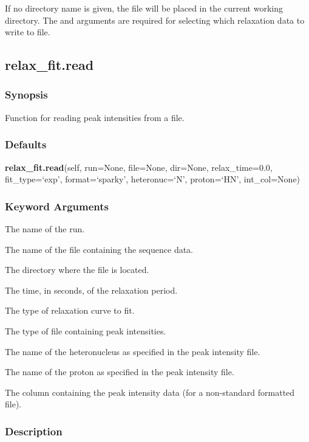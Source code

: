 If no directory name is given, the file will be placed in the current working directory.
The 
 and 
 arguments are required for selecting which relaxation data
to write to file.


\newpage

\subsection{relax\_fit.read}


\subsubsection{Synopsis}

Function for reading peak intensities from a file.

\subsubsection{Defaults}

\textsf{\textbf{relax\_fit.read}(self, run=None, file=None, dir=None, relax\_time=0.0, fit\_type=`exp', format=`sparky', heteronuc=`N', proton=`HN', int\_col=None)}


\subsubsection{Keyword Arguments}


  The name of the run.

  The name of the file containing the sequence data.

  The directory where the file is located.

  The time, in seconds, of the relaxation period.

  The type of relaxation curve to fit.

  The type of file containing peak intensities.

  The name of the heteronucleus as specified in the peak intensity file.

  The name of the proton as specified in the peak intensity file.

  The column containing the peak intensity data (for a non-standard formatted file).

\subsubsection{Description}

